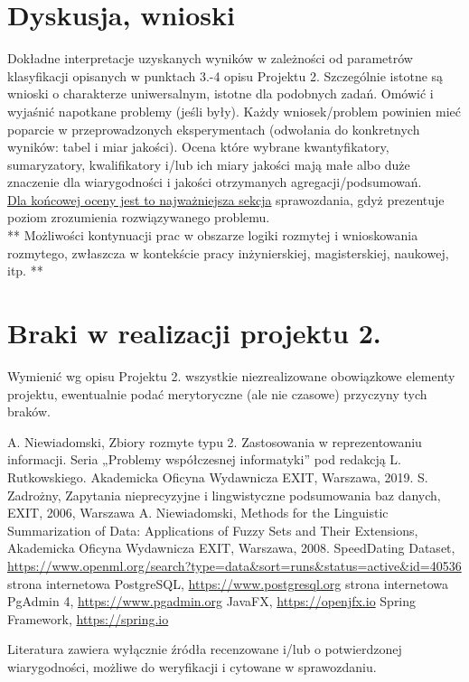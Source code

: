 \documentclass{classrep}
\begin{document}
\section{Dyskusja, wnioski}
Dokładne interpretacje uzyskanych wyników w zależności od parametrów klasyfikacji
opisanych w punktach 3.-4 opisu Projektu 2. 
Szczególnie istotne są wnioski o charakterze uniwersalnym, istotne dla podobnych zadań. 
Omówić i wyjaśnić napotkane problemy (jeśli były). Każdy wniosek/problem powinien mieć poparcie
w przeprowadzonych eksperymentach (odwołania do konkretnych wyników: tabel i miar
jakości). Ocena które wybrane kwantyfikatory, sumaryzatory, kwalifikatory i/lub ich
miary jakości mają małe albo duże znaczenie dla wiarygodności i jakości otrzymanych
agregacji/podsumowań.  \\
\underline{Dla końcowej oceny jest to najważniejsza sekcja} sprawozdania, gdyż prezentuje poziom
zrozumienia rozwiązywanego problemu.\\

** Możliwości kontynuacji prac w obszarze logiki rozmytej i wnioskowania rozmytego, zwłaszcza w kontekście pracy inżynierskiej,
magisterskiej, naukowej, itp. **\\



\section{Braki w realizacji projektu 2.}
Wymienić wg opisu Projektu 2. wszystkie niezrealizowane obowiązkowe elementy projektu, ewentualnie
podać merytoryczne (ale nie czasowe) przyczyny tych braków. 


\begin{thebibliography}{99}
  A. Niewiadomski, Zbiory rozmyte typu 2. Zastosowania w reprezentowaniu informacji.  Seria „Problemy współczesnej informatyki” pod redakcją L. Rutkowskiego. Akademicka Oficyna Wydawnicza EXIT, Warszawa, 2019.
 S. Zadrożny, Zapytania nieprecyzyjne i lingwistyczne podsumowania baz danych, EXIT, 2006, Warszawa
 A. Niewiadomski, Methods for the Linguistic Summarization of Data: Applications of Fuzzy Sets and Their Extensions, Akademicka Oficyna Wydawnicza EXIT, Warszawa, 2008.
 SpeedDating Dataset, \url{https://www.openml.org/search?type=data&sort=runs&status=active&id=40536}
 strona internetowa PostgreSQL, \url{https://www.postgresql.org}
 strona internetowa PgAdmin 4, \url{https://www.pgadmin.org}
 JavaFX, \url{https://openjfx.io}
 Spring Framework, \url{https://spring.io}

\end{thebibliography}

Literatura zawiera wyłącznie źródła recenzowane i/lub o potwierdzonej wiarygodności,
możliwe do weryfikacji i cytowane w sprawozdaniu. 
\end{document}
